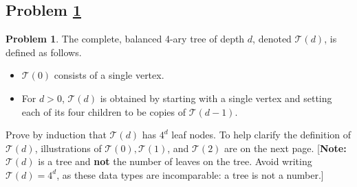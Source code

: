 \documentclass[11pt]{article}
\theoremstyle{definition}
\theoremstyle{definition}
\newtheorem{required}{Problem}
\theoremstyle{definition}
\begin{document}
\newpage
\subsection{Problem \ref{Induction3}}
\begin{required} \label{Induction3}
The complete, balanced 4-ary tree of depth $d$, denoted $\mathcal{T}(d)$, is defined as follows. 
\begin{itemize}
\item $\mathcal{T}(0)$ consists of a single vertex.
\item For $d > 0$, $\mathcal{T}(d)$ is obtained by starting with a single vertex and setting each of its four children to be copies of $\mathcal{T}(d-1)$.
\end{itemize}

\noindent Prove by induction that $\mathcal{T}(d)$ has $4^{d}$ leaf nodes. To help clarify the definition of $\mathcal{T}(d)$, illustrations of $\mathcal{T}(0), \mathcal{T}(1)$, and $\mathcal{T}(2)$ are on the next page. [\textbf{Note:} $\mathcal{T}(d)$ is a tree and \textbf{not} the number of leaves on the tree. Avoid writing $\mathcal{T}(d) = 4^{d}$, as these data types are incomparable: a tree is not a number.]
\end{required}
\end{document}
